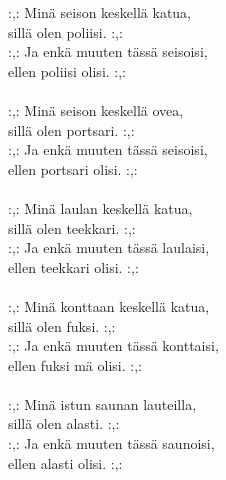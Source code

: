
:,: Minä seison keskellä katua, \\ sillä olen poliisi. :,: \\ :,: Ja enkä muuten tässä seisoisi, \\ ellen poliisi olisi. :,: \\ \hspace{10mm} \\ :,: Minä seison keskellä ovea, \\ sillä olen portsari. :,: \\ :,: Ja enkä muuten tässä seisoisi, \\ ellen portsari olisi. :,: \\ \hspace{10mm} \\ :,: Minä laulan keskellä katua, \\ sillä olen teekkari. :,: \\ :,: Ja enkä muuten tässä laulaisi, \\ ellen teekkari olisi. :,: \\ \hspace{10mm} \\ :,: Minä konttaan keskellä katua, \\ sillä olen fuksi. :,: \\ :,: Ja enkä muuten tässä konttaisi, \\ ellen fuksi mä olisi. :,: \\ \hspace{10mm} \\ :,: Minä istun saunan lauteilla, \\ sillä olen alasti. :,: \\ :,: Ja enkä muuten tässä saunoisi, \\ ellen alasti olisi. :,: